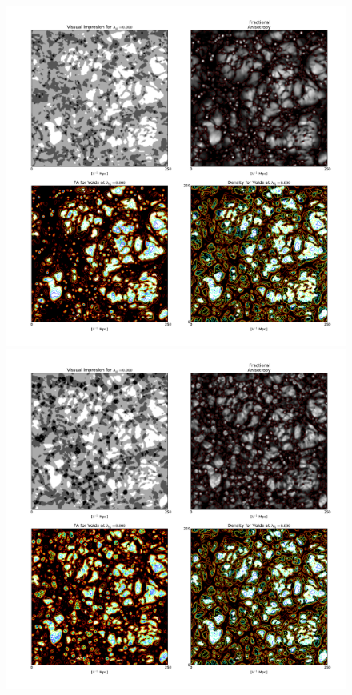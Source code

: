 \documentclass[a4,useAMS,usenatbib,usegraphicx]{latex/mn2e}
\begin{document}
\begin{flushleft}
\begin{figure}
\centering

  \includegraphics[trim = 25mm 200mm 18mm 15mm, clip, keepaspectratio=true,
  width=0.5\textheight]{./figures/cosmicweb_FA_Tweb.pdf}
  
  \includegraphics[trim = 25mm 200mm 18mm 15mm, clip, keepaspectratio=true,
  width=0.5\textheight]{./figures/cosmicweb_FA_Vweb.pdf}  
  

\end{figure}
\end{flushleft}
\end{document}
